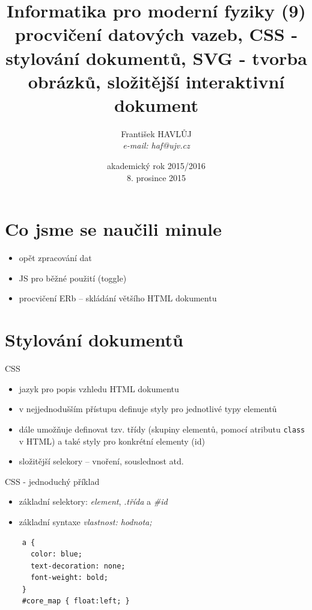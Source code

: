 \documentclass{beamer}
\title[IMF (9)]{Informatika pro moderní fyziky (9)\\ procvičení datových vazeb, CSS - stylování dokumentů, SVG - tvorba obrázků, složitější interaktivní dokument}
\author[Franti\v{s}ek HAVL\r{U}J, ORF ÚJV Řež]{Franti\v{s}ek HAVL\r{U}J\\{\scriptsize \emph{e-mail: haf@ujv.cz}}}
\date{akademický rok 2015/2016\\8. prosince 2015}
\institute[ORF ÚJV Řež]
{ÚJV Řež\\oddělení Reaktorové fyziky a podpory palivového cyklu}
\begin{document}
\begin{frame}
  \titlepage
\end{frame}

\begin{frame}
  \tableofcontents
\end{frame}

\section{Co jsme se naučili minule}

\begin{frame}{}
  \begin{itemize}
    \item opět zpracování dat
    \item JS pro běžné použití (toggle)
    \item procvičení ERb -- skládání většího HTML dokumentu
  \end{itemize}
\end{frame}

\section{Stylování dokumentů}

\begin{frame}{CSS}
  \begin{itemize}
    \item jazyk pro popis vzhledu HTML dokumentu
    \item v nejjednodušším přístupu definuje styly pro jednotlivé typy elementů
    \item dále umožňuje definovat tzv. třídy (skupiny elementů, pomocí atributu \texttt{class} v HTML) a také styly pro konkrétní elementy (id)
    \item složitější selekory -- vnoření, souslednost atd.
  \end{itemize}
\end{frame}

\begin{frame}[fragile]{CSS - jednoduchý příklad}
  \begin{itemize}
    \item základní selektory: \emph{element}, \emph{.třída} a \emph{\#id}
    \item základní syntaxe \emph{vlastnost: hodnota;}
  \end{itemize}
  \scriptsize
  \begin{verbatim}
    a {
      color: blue;
      text-decoration: none;
      font-weight: bold;
    }
    #core_map { float:left; }
  \end{verbatim}
\end{frame}
\end{document}
